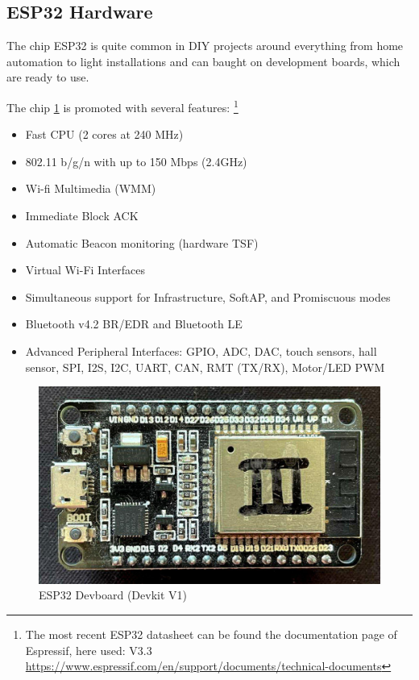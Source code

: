 \subsection*{ESP32 Hardware}

The chip ESP32 is quite common in DIY projects around everything from home automation to light installations 
and can baught on development boards, which are ready to use.

The chip \ref{fig:esp32} is promoted with several features: 
\footnote{The most recent ESP32 datasheet can be found the documentation page of Espressif, here used: V3.3\\
	\url{https://www.espressif.com/en/support/documents/technical-documents}}
\begin{itemize}
	\setlength\itemsep{-0.0em}
	\item Fast CPU (2 cores at 240 MHz)
	\item 802.11 b/g/n with up to 150 Mbps (2.4GHz)
	\item Wi-fi Multimedia (WMM)
	\item Immediate Block ACK
	\item Automatic Beacon monitoring (hardware TSF)
	\item Virtual Wi-Fi Interfaces
	\item Simultaneous support for Infrastructure, SoftAP, and Promiscuous modes
	\item Bluetooth v4.2 BR/EDR and Bluetooth LE
	\item Advanced Peripheral Interfaces: GPIO, ADC, DAC, touch sensors, hall sensor, 
	SPI, I2S, I2C, UART, CAN, RMT (TX/RX), Motor/LED PWM 
\end{itemize}

\begin{figure}[h]
	\centering
	\includegraphics[scale=0.2]{figures/espdevboard.jpg}
	\caption{ESP32 Devboard (Devkit V1)}
	\label{fig:esp32}%
\end{figure}

